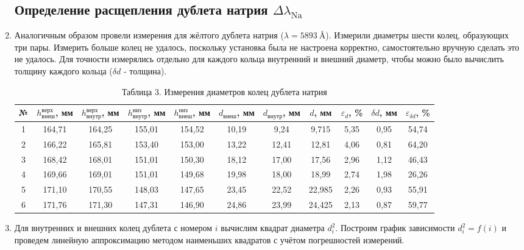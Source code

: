 \documentclass[a4paper]{article}
\begin{document}
\begin{enumerate}
\subsection{Определение расщепления дублета натрия $\Delta\lambda_{\text{Na}}$}

\item Аналогичным образом провели измерения для жёлтого дублета натрия ($\lambda = 5893~\text{\AA}$). Измерили диаметры шести колец, образующих три пары. Измерить больше колец не удалось, поскольку установка была не настроена корректно, самостоятельно вручную сделать это не удалось. Для точности измерялись отдельно для каждого кольца внутренний и внешний диаметр, чтобы можно было вычислить толщину каждого кольца ($\delta d$ - толщина).

\begin{table}[h!]
    \centering
    \begin{tabular}{|c|c|c|c|c|c|c|c|c|c|c|}
        \hline
        № & $h_{\text{внеш}}^{\text{верх}}$, мм & $h_{\text{внутр}}^{\text{верх}}$, мм & $h_{\text{внутр}}^{\text{низ}}$, мм & $h_{\text{внеш}}^{\text{низ}}$, мм & $d_{\text{внеш}}$, мм & $d_{\text{внутр}}$, мм & $d$, мм & $\varepsilon_{d}$, \% & $\delta d$, мм & $\varepsilon_{\delta d}$, \% \\ \hline
        1 & 164,71 & 164,25 & 155,01 & 154,52 & 10,19 & 9,24 & 9,715 & 5,35 & 0,95 & 54,74 \\ \hline
        2 & 166,22 & 165,81 & 153,40 & 153,00 & 13,22 & 12,41 & 12,81 & 4,06 & 0,81 & 64,20 \\ \hline
        3 & 168,42 & 168,01 & 151,01 & 150,30 & 18,12 & 17,00 & 17,56 & 2,96 & 1,12 & 46,43 \\ \hline
        4 & 169,66 & 169,01 & 151,01 & 149,68 & 19,98 & 18,00 & 18,99 & 2,74 & 1,98 & 26,26 \\ \hline
        5 & 171,10 & 170,55 & 148,03 & 147,65 & 23,45 & 22,52 & 22,985 & 2,26 & 0,93 & 55,91 \\ \hline
        6 & 171,76 & 171,30 & 147,31 & 146,90 & 24,86 & 23,99 & 24,425 & 2,13 & 0,87 & 59,77 \\ \hline
    \end{tabular}
    \caption{Таблица 3. Измерения диаметров колец дублета натрия}
    \label{tab:na}
\end{table}

\item Для внутренних и внешних колец дублета с номером $i$ вычислим квадрат диаметра $d_i^2$. Построим график зависимости $d_i^2 = f(i)$ и проведем линейную аппроксимацию методом наименьших квадратов с учётом погрешностей измерений. 


\end{enumerate}
\end{document}
